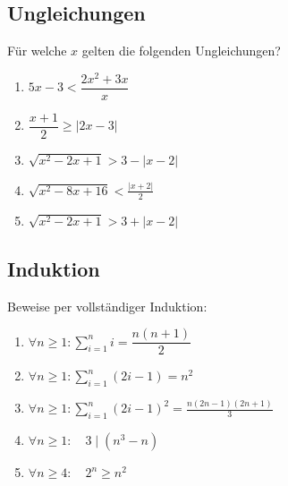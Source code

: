 \documentclass[11pt, a4paper]{article}
\newcommand{\abs}[1]{\left\lvert#1\right\rvert}
\begin{document}
\subsection{Ungleichungen}
Für welche $x$ gelten die folgenden Ungleichungen?
\begin{enumerate}
	\item $5x-3 < \dfrac{2x^2+3x}{x}$
	\item $\dfrac{x+1}{2} \geq \abs{2x-3}$
	\item $\sqrt{x^2-2x+1} > 3 - |x-2|$
	\item $\sqrt{x^2-8x+16} < \frac{\abs{x+2}}{2}$
	\item $\sqrt{x^2-2x+1} > 3 + |x-2|$
\end{enumerate}

\subsection{Induktion}
Beweise per vollständiger Induktion:
\begin{enumerate}
	\item $\forall n \geq 1 : \sum_{i=1}^n i = \dfrac{n(n+1)}{2}$
	\item $\forall n \geq 1 : \sum_{i=1}^n (2i-1) = n^2$
	\item $\forall n \geq 1 : \sum_{i=1}^n (2i-1)^2 = \frac{n (2n-1)(2n+1)}{3}$
	\item $\forall n \geq 1 : \quad 3 \mid (n^3 - n)$
	\item $\forall n \geq 4 : \quad 2^n \geq n^2$
\end{enumerate}
\end{document}
